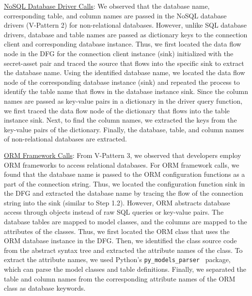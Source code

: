 \uline{NoSQL Database Driver Calls}: We observed that the database name, corresponding table, and column names are passed in the NoSQL database drivers (V-Pattern 2) for non-relational databases. However, unlike SQL database drivers, database and table names are passed as dictionary keys to the connection client and corresponding database instance. Thus, we first located the data flow node in the DFG for the connection client instance (sink) initialized with the secret-asset pair and traced the source that flows into the specific sink to extract the database name. Using the identified database name, we located the data flow node of the corresponding database instance (sink) and repeated the process to identify the table name that flows in the database instance sink. Since the column names are passed as key-value pairs in a dictionary in the driver query function, we first traced the data flow node of the dictionary that flows into the table instance sink. Next, to find the column names, we extracted the keys from the key-value pairs of the dictionary. Finally, the database, table, and column names of non-relational databases are extracted.



\uline{ORM Framework Calls}: From V-Pattern 3, we observed that developers employ ORM frameworks to access relational databases. For ORM framework calls, we found that the database name is passed to the ORM configuration functions as a part of the connection string. Thus, we located the configuration function sink in the DFG and extracted the database name by tracing the flow of the connection string into the sink (similar to Step 1.2). However, ORM abstracts database access through objects instead of raw SQL queries or key-value pairs. The database tables are mapped to model classes, and the columns are mapped to the attributes of the classes. Thus, we first located the ORM class that uses the ORM database instance in the DFG. Then, we identified the class source code from the abstract syntax tree and extracted the attribute names of the class. To extract the attribute names, we used Python's \texttt{py\_models\_parser}~\cite{py-models-parser} package, which can parse the model classes and table definitions. Finally, we separated the table and column names from the corresponding attribute names of the ORM class as database keywords.


